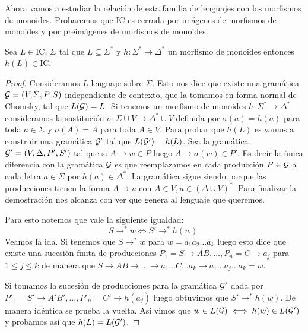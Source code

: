 \documentclass[tesis.tex]{subfiles}
\begin{document}
Ahora vamos a estudiar la relación de esta familia de lenguajes con los morfismos de monoides. 
Probaremos que IC es cerrada por imágenes de morfismos de monoides y por preimágenes de morfismos de monoides.
 

\begin{prop}\label{morfismos-monoides-ic}

		Sea $L \in \text{IC}$, $\Sigma$ tal que $L \subseteq \Sigma^{*}$ y $h:\Sigma^{*} \to \Delta^*$ un morfismo de monoides 
		 entonces $h(L) \in \text{IC}$.
		 
\end{prop}

\begin{proof}
		Consideramos $L$ lenguaje \ic sobre $\Sigma$.
		Esto nos dice que existe una gramática ${\cal G} = (V, \Sigma, P, S) $ independiente de contexto, que la tomamos en forma normal de Chomsky, tal que $L({\cal G}) = L$. 
		Si tenemos un morfismo de monoides $h: \Sigma^* \to \Delta^*$ consideramos la sustitución $\sigma:\Sigma \cup V \to \Delta^* \cup V$ definida por $\sigma(a) = h(a)$ para toda $a \in \Sigma$ y $\sigma(A) = A$ para toda $A \in V$.		
		Para probar que $h(L)$ es \ic vamos a construir una gramática ${\cal G}'$ tal que $L({\cal G}') = h(L)$.
		Sea la gramática ${\cal G}'  = (V, \Delta, P', S')$ tal que si $A \to w \in P$ luego $A \to \sigma(w) \in P'$.
		Es decir la única diferencia con la gramática ${\cal G}$ es que reemplazamos en cada producción $P \in {\cal G}$ a cada letra $a \in \Sigma$ por $h(a) \in \Delta^*$.
		La gramática sigue siendo \ic porque las producciones tienen la forma $A \to u$ con $A \in V, u \in (\Delta \cup V)^*$.
		Para finalizar la demostración nos alcanza con ver que genera al lenguaje que queremos.
		
		Para esto notemos que vale la siguiente igualdad:
		\[
			S \to^* w \iff S' \to^{*} h(w).
		\]
		Veamos la ida. 
		Si tenemos que $S \to^* w $  para $w = a_{1}a_{2} \dots a_{k}$ luego esto dice que existe una sucesión finita de producciones $P_{1} = S \to AB, \dots, P_{n} = C \to a_{j}$ para $ 1 \le j \le k$ de manera que 
		$S \to AB \to \dots \to a_{1}\dots C \dots a_{k} \to a_{1} \dots a_{j} \dots a_{k} = w$.
		
		Si tomamos la sucesión de producciones para la gramática ${\cal G}'$ dada por $P'_{1} = S' \to A'B', \dots, P'_{n} = C' \to h(a_{j})$ luego obtuvimos que $S' \to^* h(w)$.
		De manera idéntica se prueba la vuelta.
		Así vimos que $w \in L({\cal G}) \iff h(w) \in L({\cal G}')$ y probamos así que $h(L) = L({\cal G}')$.
		

\end{proof}
\end{document}
